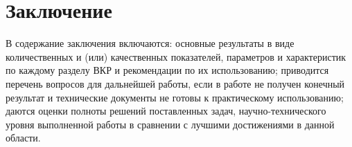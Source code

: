 \section*{\centering Заключение}

В содержание заключения включаются: основные результаты в виде количественных и (или) качественных показателей, параметров и характеристик по каждому разделу ВКР и рекомендации по их использованию; приводится перечень вопросов для дальнейшей работы, если в работе не получен конечный результат и технические документы не готовы к практическому использованию; даются оценки полноты решений поставленных задач, научно-технического уровня выполненной работы в сравнении с лучшими достижениями в данной области.

\newpage
